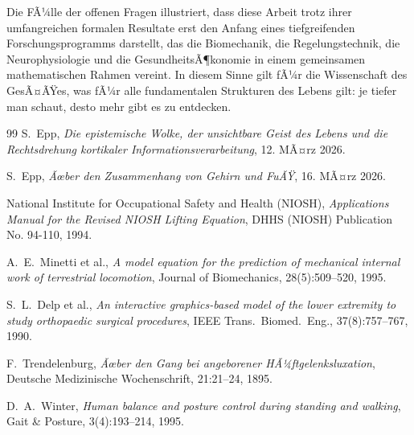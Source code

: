 ﻿\documentclass[12pt,a4paper]{report}
\theoremstyle{plain}
\theoremstyle{definition}
\theoremstyle{remark}
\begin{document}
	\bigskip
	\noindent Die FÃ¼lle der offenen Fragen illustriert, dass diese Arbeit
	trotz ihrer umfangreichen formalen Resultate erst den Anfang
	eines tiefgreifenden Forschungsprogramms darstellt, das die
	Biomechanik, die Regelungstechnik, die Neurophysiologie und die
	GesundheitsÃ¶konomie in einem gemeinsamen mathematischen Rahmen vereint.
	In diesem Sinne gilt fÃ¼r die Wissenschaft des GesÃ¤ÃŸes, was fÃ¼r alle
	fundamentalen Strukturen des Lebens gilt: je tiefer man schaut,
	desto mehr gibt es zu entdecken.
	
	\begin{thebibliography}{99}
		S.~Epp, \emph{Die epistemische Wolke, der unsichtbare Geist des Lebens
			und die Rechtsdrehung kortikaler Informationsverarbeitung}, 12. MÃ¤rz 2026.
		
		S.~Epp, \emph{Ãœber den Zusammenhang von Gehirn und FuÃŸ}, 16. MÃ¤rz 2026.
		
		National Institute for Occupational Safety and Health (NIOSH),
		\emph{Applications Manual for the Revised NIOSH Lifting Equation},
		DHHS (NIOSH) Publication No. 94-110, 1994.
		
		A.~E.~Minetti et al.,
		\emph{A model equation for the prediction of mechanical internal work
			of terrestrial locomotion},
		Journal of Biomechanics, 28(5):509--520, 1995.
		
		S.~L.~Delp et al.,
		\emph{An interactive graphics-based model of the lower extremity
			to study orthopaedic surgical procedures},
		IEEE Trans.~Biomed.~Eng., 37(8):757--767, 1990.
		
		F.~Trendelenburg,
		\emph{Ãœber den Gang bei angeborener HÃ¼ftgelenksluxation},
		Deutsche Medizinische Wochenschrift, 21:21--24, 1895.
		
		D.~A.~Winter,
		\emph{Human balance and posture control during standing and walking},
		Gait \& Posture, 3(4):193--214, 1995.
	\end{thebibliography}
	
\end{document}

